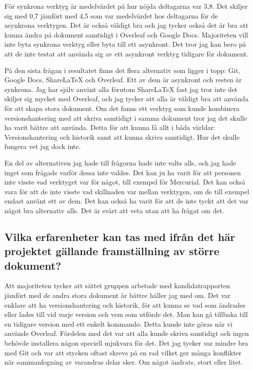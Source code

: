 För synkrona verktyg är medelvärdet på hur nöjda deltagarna var 3,8. Det skiljer sig med 0,7 jämfört med 4,5 som var medelvärdet hos deltagarna för de asynkrona verktygen. Det är också väldigt bra och jag tycker också det är bra att kunna ändra på dokument samtidigt i Overleaf och Google Docs. Majoriteten vill inte byta synkrona verktyg eller byta till ett asynkront. Det tror jag kan bero på att de inte testat att använda sig av ett asynkront verktyg tidigare för dokument.

På den sista frågan i resultatet finns det flera alternativ som ligger i topp: Git, Google Docs, ShareLaTeX och Overleaf. Ett av dem är asynkront och resten är synkrona. Jag har själv använt alla förutom ShareLaTeX fast jag tror inte det skiljer sig mycket med Overleaf, och jag tycker att alla är väldigt bra att använda för att skapa stora dokument. Om det fanns ett verktyg som kunde kombinera versionshantering med att skriva samtidigt i samma dokument tror jag det skulle ha varit bättre att använda. Detta för att kunna få allt i båda världar: Versionshantering och historik samt att kunna skriva samtidigt. Hur det skulle fungera vet jag dock inte.

En del av alternativen jag hade till frågorna hade inte valts alls, och jag hade inget som frågade varför dessa inte valdes. Det kan ju ha varit för att personen inte visste vad verktyget var för något, till exempel för Mercurial. Det kan också vara för att de inte visste vad skillnaden var mellan verktygen, om de till exempel endast använt ett av dem. Det kan också ha varit för att de inte tyckt att det var något bra alternativ alls. Det är svårt att veta utan att ha frågat om det. 

\subsection{Vilka erfarenheter kan tas med ifrån det här projektet gällande framställning av större dokument?}
Att majoriteten tycker att sättet gruppen arbetade med kandidatrapporten jämfört med de andra stora dokument är bättre håller jag med om. Det var enklare att ha versionshantering och historik, för att kunna se vad som ändrades eller lades till vid varje version och vem som utförde det. Man kan gå tillbaka till en tidigare version med ett enkelt kommando. Detta kunde inte göras när vi använde Overleaf. Fördelen med det var att alla kunde skriva samtidigt och ingen behövde installera någon speciell mjukvara för det. Det jag tycker var mindre bra med Git och \latex var att stycken oftast skrevs på en rad vilket ger många konflikter när sammanfogning av varandras delar sker. Om något ändrats, stort eller litet.

